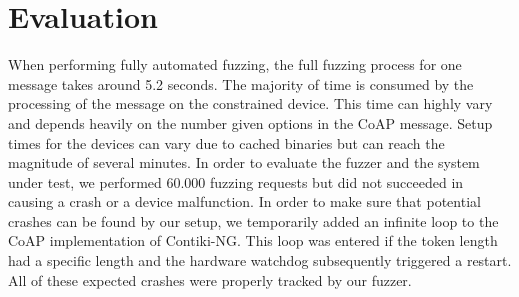 \section{Evaluation}
\label{section:evaluation}


When performing fully automated fuzzing, the full fuzzing process for one message takes around 5.2 seconds. The majority of time is consumed by the processing of the message on the constrained device. This time can highly vary and depends heavily on the number given options in the CoAP message. Setup times for the devices can vary due to cached binaries but can reach the magnitude of several minutes. In order to evaluate the fuzzer and the system under test, we performed 60.000 fuzzing requests but did not succeeded in causing a crash or a device malfunction. In order to make sure that potential crashes can be found by our setup, we temporarily added an infinite loop to the CoAP implementation of Contiki-NG. This loop was entered if the token length had a specific length and the hardware watchdog subsequently triggered a restart. All of these expected crashes were properly tracked by our fuzzer.